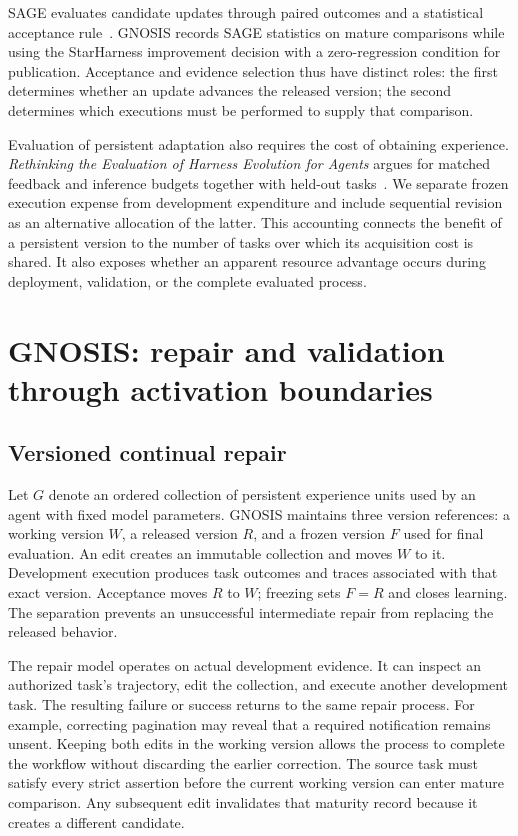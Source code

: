 \documentclass{ecai}
\begin{document}
SAGE evaluates candidate updates through paired outcomes and a statistical acceptance rule~\cite{sage}. GNOSIS records SAGE statistics on mature comparisons while using the StarHarness improvement decision with a zero-regression condition for publication. Acceptance and evidence selection thus have distinct roles: the first determines whether an update advances the released version; the second determines which executions must be performed to supply that comparison.

Evaluation of persistent adaptation also requires the cost of obtaining experience. \emph{Rethinking the Evaluation of Harness Evolution for Agents} argues for matched feedback and inference budgets together with held-out tasks~\cite{rethinking}. We separate frozen execution expense from development expenditure and include sequential revision as an alternative allocation of the latter. This accounting connects the benefit of a persistent version to the number of tasks over which its acquisition cost is shared. It also exposes whether an apparent resource advantage occurs during deployment, validation, or the complete evaluated process.

\section{GNOSIS: repair and validation through activation boundaries}
\label{sec:method}

\subsection{Versioned continual repair}

Let $G$ denote an ordered collection of persistent experience units used by an agent with fixed model parameters. GNOSIS maintains three version references: a working version $W$, a released version $R$, and a frozen version $F$ used for final evaluation. An edit creates an immutable collection and moves $W$ to it. Development execution produces task outcomes and traces associated with that exact version. Acceptance moves $R$ to $W$; freezing sets $F=R$ and closes learning. The separation prevents an unsuccessful intermediate repair from replacing the released behavior.

The repair model operates on actual development evidence. It can inspect an authorized task's trajectory, edit the collection, and execute another development task. The resulting failure or success returns to the same repair process. For example, correcting pagination may reveal that a required notification remains unsent. Keeping both edits in the working version allows the process to complete the workflow without discarding the earlier correction. The source task must satisfy every strict assertion before the current working version can enter mature comparison. Any subsequent edit invalidates that maturity record because it creates a different candidate.
\end{document}
